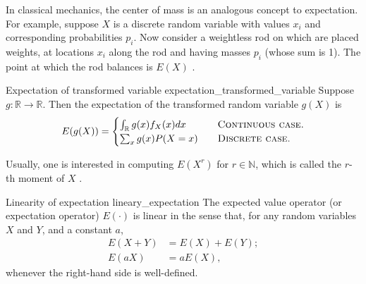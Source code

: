 In classical mechanics, the center of mass is an analogous concept to expectation. For example, suppose $X$ is a discrete random variable with values $x_i$ and corresponding probabilities $p_i$. Now consider a weightless rod on which are placed weights, at locations $x_i$ along the rod and having masses $p_i$ (whose sum is 1). The point at which the rod balances is $E(X)$ \cite{wikipedia_expected_value}.

\begin{lemma}{Expectation of transformed variable \cite{math2901_notes}}{expectation_transformed_variable}
	Suppose $g : \mathbb{R} \to \mathbb{R}$. Then the expectation of the transformed random variable $g(X)$ is
	$$
	E(g(X)) = 
		\begin{cases}
			\int_{\mathbb{R}} g(x) f_X(x) dx \quad & \text{\textsc{Continuous case.}} \\
			\sum_x g(x) P(X = x) \quad & \text{\textsc{Discrete case.}}
		\end{cases}
	$$
\end{lemma}

Usually, one is interested in computing $E(X^r)$ for $r \in \mathbb{N}$, which is called the $r$-th moment of $X$ \cite{math2901_notes}.

\begin{lemma}{Linearity of expectation \cite{wikipedia_expected_value}}{lineary_expectation}
	The expected value operator (or expectation operator) $E(\cdot)$ is linear in the sense that, for any random variables $X$ and $Y$, and a constant $a$,
	\begin{align*}
		E(X + Y) &= E(X) + E(Y); \\
		E(aX) &= a E(X),
	\end{align*}
	whenever the right-hand side is well-defined.
\end{lemma}